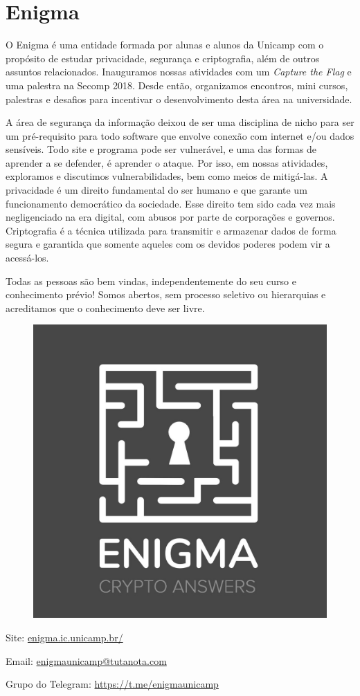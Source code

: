 
\section{Enigma}

O Enigma é uma entidade formada por alunas e alunos da Unicamp com o propósito
de estudar privacidade, segurança e criptografia, além de outros assuntos
relacionados. Inauguramos nossas atividades com um \textit{Capture the Flag} e
uma palestra na Secomp 2018. Desde então, organizamos encontros, mini cursos,
palestras e desafios para incentivar o desenvolvimento desta área na
universidade.

A área de segurança da informação deixou de ser uma disciplina de nicho para
ser um pré-requisito para todo software que envolve conexão com internet e/ou
dados sensíveis. Todo site e programa pode ser vulnerável, e uma das formas de
aprender a se defender, é aprender o ataque. Por isso, em nossas atividades,
exploramos e discutimos vulnerabilidades, bem como meios de mitigá-las. A
privacidade é um direito fundamental do ser humano e que garante um
funcionamento democrático da sociedade. Esse direito tem sido cada vez mais
negligenciado na era digital, com abusos por parte de corporações e governos.
Criptografia é a técnica utilizada para transmitir e armazenar dados de forma
segura e garantida que somente aqueles com os devidos poderes podem vir a
acessá-los.

Todas as pessoas são bem vindas, independentemente do seu curso e conhecimento 
prévio! Somos abertos, sem processo seletivo ou hierarquias e acreditamos que
o conhecimento deve ser livre.

\begin{figure}[H]
  \centering
  \includegraphics[width=.24\textwidth]
  {img/alem_da_graduacao/enigma_logo.jpg}
\end{figure}


\begin{compactitemize}
\item Site: \url{enigma.ic.unicamp.br/}
\item Email: \url{enigmaunicamp@tutanota.com}
\item Grupo do Telegram: \url{https://t.me/enigmaunicamp}
\end{compactitemize}
